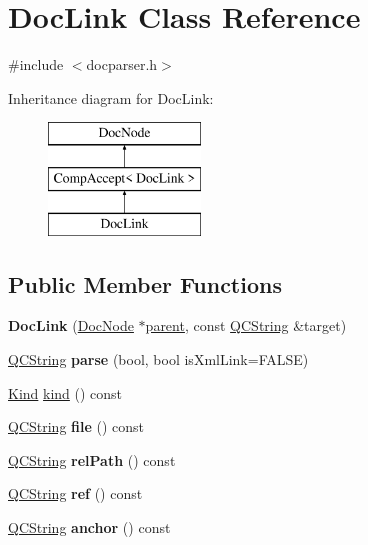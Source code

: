 \hypertarget{class_doc_link}{}\section{Doc\+Link Class Reference}
\label{class_doc_link}


{\ttfamily \#include $<$docparser.\+h$>$}

Inheritance diagram for Doc\+Link\+:\begin{figure}[H]
\begin{center}
\leavevmode
\includegraphics[height=3.000000cm]{class_doc_link}
\end{center}
\end{figure}
\subsection*{Public Member Functions}
\begin{DoxyCompactItemize}
\item 
\mbox{\label{class_doc_link_a3639f07a695c77d818748fe711b37909}} 
{\bfseries Doc\+Link} (\mbox{\hyperlink{class_doc_node}{Doc\+Node}} $\ast$\mbox{\hyperlink{class_doc_node_a73e8ad29a91cfceb0968eb00db71a23d}{parent}}, const \mbox{\hyperlink{class_q_c_string}{Q\+C\+String}} \&target)
\item 
\mbox{\label{class_doc_link_aeb676914fb893fa31c99b39c1f7bb6d3}} 
\mbox{\hyperlink{class_q_c_string}{Q\+C\+String}} {\bfseries parse} (bool, bool is\+Xml\+Link=F\+A\+L\+SE)
\item 
\mbox{\hyperlink{class_doc_node_aebd16e89ca590d84cbd40543ea5faadb}{Kind}} \mbox{\hyperlink{class_doc_link_a320720d7a24889d3cd3d6210bfc526fa}{kind}} () const
\item 
\mbox{\label{class_doc_link_a39a863f3f56d0247210911c2381e39f2}} 
\mbox{\hyperlink{class_q_c_string}{Q\+C\+String}} {\bfseries file} () const
\item 
\mbox{\label{class_doc_link_afc299bde1a6e0301feaed4c0de072691}} 
\mbox{\hyperlink{class_q_c_string}{Q\+C\+String}} {\bfseries rel\+Path} () const
\item 
\mbox{\label{class_doc_link_a927a404f81961d4545e5ad41e0c4d35a}} 
\mbox{\hyperlink{class_q_c_string}{Q\+C\+String}} {\bfseries ref} () const
\item 
\mbox{\label{class_doc_link_a12c7fd0cd735e1fb53216fc9fa26bf61}} 
\mbox{\hyperlink{class_q_c_string}{Q\+C\+String}} {\bfseries anchor} () const
\end{DoxyCompactItemize}
